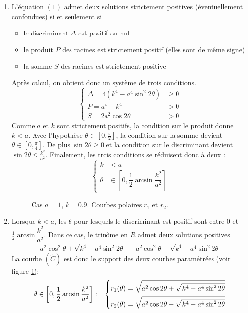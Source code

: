 \begin{enumerate}
\begin{enumerate}
\item L'équation $(1)$ admet deux solutions strictement positives (éventuellement confondues) si et seulement si
\begin{itemize}
 \item le discriminant $\Delta$ est positif ou nul
 \item le produit $P$ des racines est strictement positif (elles sont de même signe)
 \item la somme $S$ des racines est strictement positive
\end{itemize}
Après calcul, on obtient donc un système de trois conditions.
\begin{displaymath}
 \left\lbrace 
\begin{aligned}
 \Delta = 4(k^4-a^4\sin^2 2\theta) &\geq 0 \\
 P = a^4-k^4 &>0\\
 S = 2a^2\cos2\theta &>0
\end{aligned}
\right. 
\end{displaymath}
Comme $a$ et $k$ sont strictement positifs, la condition sur le produit donne $k<a$. Avec l'hypothèse $\theta\in[0,\frac{\pi}{2}]$, la condition sur la somme devient $\theta\in[0,\frac{\pi}{4}]$. De plus $\sin 2\theta \geq 0$ et la condition sur le discriminant devient $\sin2\theta\leq \frac{k^2}{a^2}$. Finalement, les trois conditions se réduisent donc à deux :
\begin{displaymath}
 \left\lbrace 
\begin{aligned}
k &<a\\
\theta &\in \left[0,\dfrac{1}{2}\arcsin\dfrac{k^2}{a^2}\right]
\end{aligned}
\right. 
\end{displaymath}
\begin{figure}[ht]
 \centering
 
 \caption{Cas $a=1$, $k=0.9$. Courbes polaires $r_1$ et $r_2$.}
 \label{Clemn_1}
\end{figure}

\item Lorsque $k<a$, les $\theta$ pour lesquels le discriminant est positif sont entre $0$ et $\frac{1}{2}\arcsin\dfrac{k^2}{a^2}$. Dans ce cas, le trinôme en $R$ admet deux solutions positives
\begin{align*}
 a^2\cos^2\theta + \sqrt{k^4-a^4\sin^2 2\theta} & & a^2\cos^2\theta - \sqrt{k^4-a^4\sin^2 2\theta} 
\end{align*}
La courbe $(\tilde{C})$ est donc le support des deux courbes paramétrées (voir figure \ref{Clemn_1}):
\begin{displaymath}
 \theta \in \left[0,\dfrac{1}{2}\arcsin\dfrac{k^2}{a^2}\right]:\hspace{.3cm}
\left\lbrace
\begin{aligned}
 r_1(\theta) &= \sqrt{a^2\cos 2\theta + \sqrt{k^4-a^4\sin^2 2\theta}} \\
 r_2(\theta) &= \sqrt{a^2\cos 2\theta - \sqrt{k^4-a^4\sin^2 2\theta}}
\end{aligned}
 \right. 
\end{displaymath}


\end{enumerate}
\end{enumerate}
